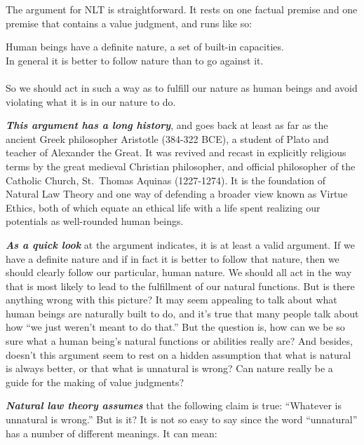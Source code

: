 \documentclass[12pt, openany]{book}
\begin{document}
The argument for NLT is straightforward. It rests on one factual premise and one premise that contains a value judgment, and runs like so:

\begin{center}

\begin{argument}

Human beings have a definite nature, a set of built-in capacities.\\
In general it is better to follow nature than to go against it.\\
~\\
So we should act in such a way as to fulfill our nature as human beings and avoid violating what it is in our nature to do.

\end{argument}

\end{center}

\textbf{\emph{This argument has a long history}}, and goes back at least as far as the ancient Greek philosopher Aristotle (384-322 BCE), a student of Plato and teacher of Alexander the Great. It was revived and recast in explicitly religious terms by the great medieval Christian philosopher, and official philosopher of the Catholic Church, St.~Thomas Aquinas (1227-1274). It is the foundation of Natural Law Theory and one way of defending a broader view known as Virtue Ethics, both of which equate an ethical life with a life spent realizing our potentials as well-rounded human beings.

\textbf{\emph{As a quick look}} at the argument indicates, it is at least a valid argument. If we have a definite nature and if in fact it is better to follow that nature, then we should clearly follow our particular, human nature. We should all act in the way that is most likely to lead to the fulfillment of our natural functions. But is there anything wrong with this picture? It may seem appealing to talk about what human beings are naturally built to do, and it's true that many people talk about how ``we just weren't meant to do that.'' But the question is, how can we be so sure what a human being's natural functions or abilities really are? And besides, doesn't this argument seem to rest on a hidden assumption that what is natural is always better, or that what is unnatural is wrong? Can nature really be a guide for the making of value judgments?

\textbf{\emph{Natural law theory assumes}} that the following claim is true: ``Whatever is unnatural is wrong.'' But is it? It is not so easy to say since the word ``unnatural'' has a number of different meanings. It can mean:
\end{document}
